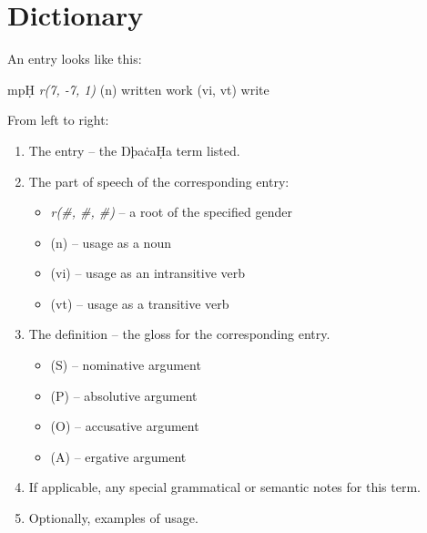 \documentclass{book}
\newcommand{\lname}{ŊþaċaḤa}
\begin{document}
\appendix

\chapter{Dictionary}

An entry looks like this:

\textsf{mpḤ} \textit{r(7, -7, 1)}
\quad (n) written work \quad (vi, vt) write

From left to right:

\begin{enumerate}
    \item The entry -- the \lname{} term listed.
    \item The part of speech of the corresponding entry:
    \begin{itemize}
        \item \textit{r(\#, \#, \#)} -- a root of the specified gender
        \item (n) -- usage as a noun
        \item (vi) -- usage as an intransitive verb
        \item (vt) -- usage as a transitive verb
    \end{itemize}
    \item The definition -- the gloss for the corresponding entry.
    \begin{itemize}
        \item (S) -- nominative argument
        \item (P) -- absolutive argument
        \item (O) -- accusative argument
        \item (A) -- ergative argument
    \end{itemize}
    \item If applicable, any special grammatical or semantic notes for this term.
    \item Optionally, examples of usage.
\end{enumerate}

\begin{multicols}{2}
    
\end{multicols}
\end{document}
